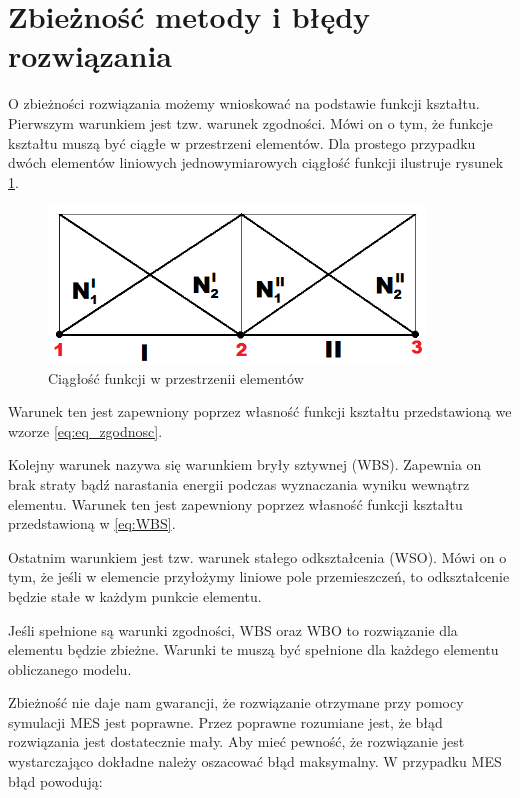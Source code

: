 
\section{Zbieżność metody i błędy rozwiązania}
\label{sec:zbieznosc_i_blad}

O zbieżności rozwiązania możemy wnioskować na podstawie funkcji kształtu. Pierwszym warunkiem jest tzw. warunek zgodności. Mówi on o tym, że funkcje kształtu muszą być ciągłe w przestrzeni elementów. Dla prostego przypadku dwóch elementów liniowych jednowymiarowych ciągłość funkcji ilustruje rysunek \ref{fig:zgodnosc}. 

\begin{figure}[h]
\centering
\includegraphics[width=10cm]{Zdjecia/3/zgodnosc}
\caption{Ciągłość funkcji w przestrzenii elementów}
\label{fig:zgodnosc}
\end{figure}

Warunek ten jest zapewniony poprzez własność funkcji kształtu przedstawioną we wzorze \ref{eq:eq_zgodnosc}.

Kolejny warunek nazywa się warunkiem bryły sztywnej (WBS). Zapewnia on brak straty bądź narastania energii podczas wyznaczania wyniku wewnątrz elementu. Warunek ten jest zapewniony poprzez własność funkcji kształtu przedstawioną w \ref{eq:WBS}.

Ostatnim warunkiem jest tzw. warunek stałego odkształcenia (WSO). Mówi on o tym, że jeśli w elemencie przyłożymy liniowe pole przemieszczeń, to odkształcenie będzie stałe w każdym punkcie elementu.

Jeśli spełnione są warunki zgodności, WBS oraz WBO to rozwiązanie dla elementu będzie zbieżne. Warunki te muszą być spełnione dla każdego elementu obliczanego modelu.

\vspace{3mm}

Zbieżność nie daje nam gwarancji, że rozwiązanie otrzymane przy pomocy symulacji MES jest poprawne. Przez poprawne rozumiane jest, że błąd rozwiązania jest dostatecznie mały. Aby mieć pewność, że rozwiązanie jest wystarczająco dokładne należy oszacować błąd maksymalny. W przypadku MES błąd powodują:


